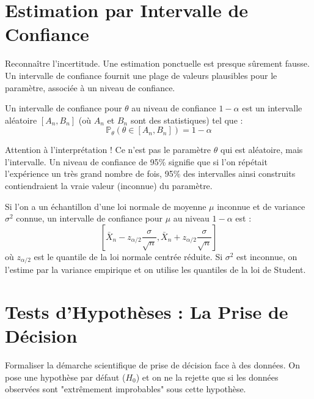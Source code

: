 \section{Estimation par Intervalle de Confiance}

\begin{objectif}
    Reconnaître l'incertitude. Une estimation ponctuelle est presque sûrement fausse. Un intervalle de confiance fournit une plage de valeurs plausibles pour le paramètre, associée à un niveau de confiance.
\end{objectif}

\begin{definition}
    Un intervalle de confiance pour $\theta$ au niveau de confiance $1-\alpha$ est un intervalle aléatoire $[A_n, B_n]$ (où $A_n$ et $B_n$ sont des statistiques) tel que :
    $$ \mathbb{P}_\theta( \theta \in [A_n, B_n] ) = 1-\alpha $$
\end{definition}
\begin{remark}
    Attention à l'interprétation ! Ce n'est pas le paramètre $\theta$ qui est aléatoire, mais l'intervalle. Un niveau de confiance de 95\% signifie que si l'on répétait l'expérience un très grand nombre de fois, 95\% des intervalles ainsi construits contiendraient la vraie valeur (inconnue) du paramètre.
\end{remark}

\begin{application}
    Si l'on a un échantillon d'une loi normale de moyenne $\mu$ inconnue et de variance $\sigma^2$ connue, un intervalle de confiance pour $\mu$ au niveau $1-\alpha$ est :
    $$ \left[ \bar{X}_n - z_{\alpha/2} \frac{\sigma}{\sqrt{n}}, \bar{X}_n + z_{\alpha/2} \frac{\sigma}{\sqrt{n}} \right] $$
    où $z_{\alpha/2}$ est le quantile de la loi normale centrée réduite. Si $\sigma^2$ est inconnue, on l'estime par la variance empirique et on utilise les quantiles de la loi de Student.
\end{application}

\section{Tests d'Hypothèses : La Prise de Décision}

\begin{objectif}
    Formaliser la démarche scientifique de prise de décision face à des données. On pose une hypothèse par défaut ($H_0$) et on ne la rejette que si les données observées sont "extrêmement improbables" sous cette hypothèse.
\end{objectif}

